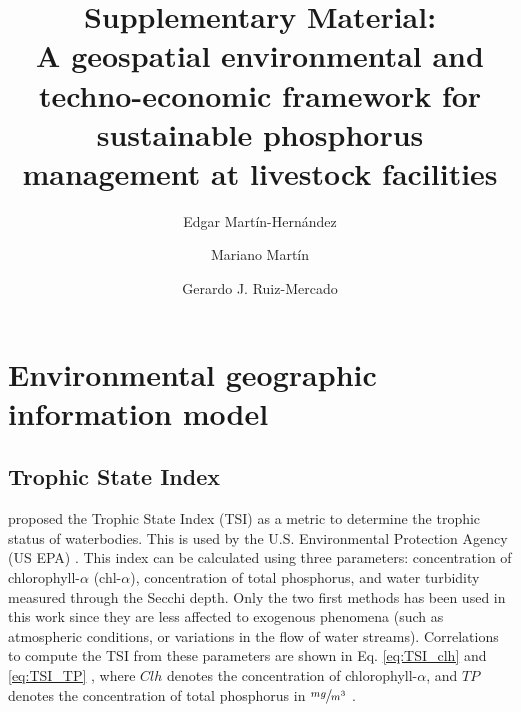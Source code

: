 \documentclass[10pt,a4paper]{article}
\begin{document}
\title{Supplementary Material: \\ A geospatial environmental and techno-economic framework for sustainable phosphorus management at livestock facilities}

\author[a,b]{\small Edgar Mart\'{i}n-Hern\'{a}ndez}
\author[b]{Mariano Mart\'{i}n}
\author[c,*]{Gerardo J. Ruiz-Mercado}




\date{}

\maketitle

\newpage
\tableofcontents

\newpage
\section{Environmental geographic information model}
\subsection{Trophic State Index}
 proposed the Trophic State Index (TSI) as a metric to determine the trophic status of waterbodies. This is used by the U.S. Environmental Protection Agency (US EPA) . This index can be calculated using three parameters: concentration of chlorophyll-$\alpha$ (chl-$\alpha$), concentration of total phosphorus, and water turbidity measured through the Secchi depth. Only the two first methods has been used in this work since they are less affected to exogenous phenomena (such as atmospheric conditions, or variations in the flow of water streams). Correlations to compute the TSI from these parameters are shown in Eq. \ref{eq:TSI_clh} and \ref{eq:TSI_TP} , where $Clh$ denotes the concentration of chlorophyll-$\alpha$, and $TP$ denotes the concentration of total phosphorus in $\sfrac{mg}{m^3}$ . 
\end{document}
